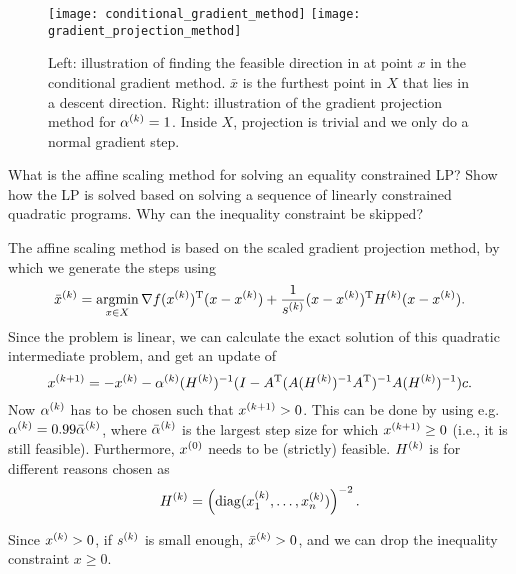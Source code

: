 \documentclass{article}
\begin{document}
\begin{figure}[H]
  \centering
  \texttt{[image: conditional\_gradient\_method]}
  \hspace{1em}
  \texttt{[image: gradient\_projection\_method]}
  \caption{Left: illustration of finding the feasible direction in at point \(x\) in the conditional
    gradient method. \(\bar{x}\) is the furthest point in \(X\) that lies in a descent direction.
    Right: illustration of the gradient projection method for \(\kth{\alpha} = 1\).  Inside \(X\),
    projection is trivial and we only do a normal gradient
    step.\label{fig:feasible-direction-methods}}
\end{figure}

\begin{question}
  What is the affine scaling method for solving an equality constrained LP? Show how the LP is
  solved based on solving a sequence of linearly constrained quadratic programs. Why can the
  inequality constraint be skipped?
\end{question}

The affine scaling method is based on the scaled gradient projection method, by which we generate
the steps using
\begin{equation*}
  \kth{\bar{x}} = \argmin_{x \in X} \T{\nabla f(\kth{x})} (x - \kth{x}) +
  \frac{1}{\kth{s}} \T{(x - \kth{x})} \kth{H} (x - \kth{x}).
\end{equation*}
Since the problem is linear, we can calculate the exact solution of this quadratic intermediate
problem, and get an update of
\begin{equation*}
  \kth[k+1]{x} = -\kth{x} -
  \kth{\alpha}(\kth{H})^{-1}(I - \T{A} (A(\kth{H})^{-1}\T{A})^{-1} A (\kth{H})^{-1})c.
\end{equation*}
Now \(\kth{\alpha}\) has to be chosen such that \(\kth[k+1]{x} > 0\).  This can be done by using
e.g. \(\kth{\alpha} = 0.99\kth{\bar{\alpha}}\), where \(\kth{\bar{\alpha}}\) is the largest step
size for which \(\kth[k+1]{x} \geq 0\) (i.e., it is still feasible).  Furthermore, \(\kth[0]{x}\)
needs to be (strictly) feasible. \(\kth{H}\) is for different reasons chosen as
\begin{equation*}
  \kth{H} = \left( \diag(\kth{x}_1, \dots, \kth{x}_n) \right)^{-2}.
\end{equation*}

Since \(\kth{x} > 0\), if \(\kth{s}\) is small enough, \(\kth{\bar{x}} > 0\), and we can drop the
inequality constraint \(x \geq 0\).
\end{document}
